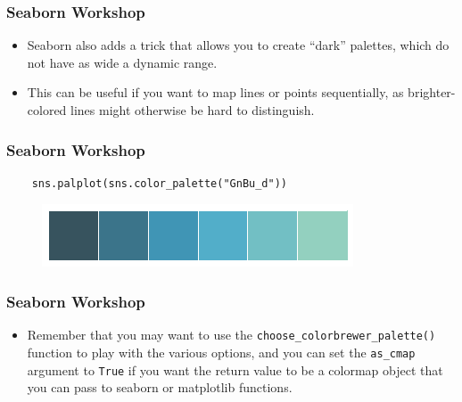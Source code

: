 \documentclass{beamer}
\begin{document}
\begin{frame}[fragile]
	\frametitle{Seaborn Workshop}
	\large
	\begin{itemize}
		\item Seaborn also adds a trick that allows you to create “dark” palettes, which do not have as wide a dynamic range. 
		\item This can be useful if you want to map lines or points sequentially, as brighter-colored lines might otherwise be hard to distinguish.
	\end{itemize}
	
\end{frame}
\begin{frame}[fragile]
	\frametitle{Seaborn Workshop}
	\large
	
	\begin{verbatim}
	sns.palplot(sns.color_palette("GnBu_d"))
	\end{verbatim}
	
	\begin{figure}
		\centering
		\includegraphics[width=0.7\linewidth]{images/color_palettes_29_0}
	\end{figure}
\end{frame}
\begin{frame}[fragile]
	\frametitle{Seaborn Workshop}
	\large
	\begin{itemize}
		\item Remember that you may want to use the \texttt{choose\_colorbrewer\_palette()} function to play with the various options, and you can set the \texttt{as\_cmap} argument to \texttt{True} if you want the return value to be a colormap object that you can pass to seaborn or matplotlib functions.
	\end{itemize}
	
\end{frame}
\end{document}
